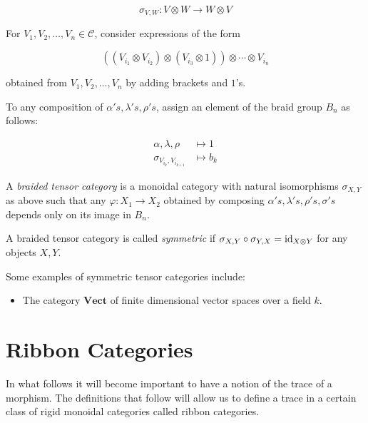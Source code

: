 \begin{equation}
    \sigma_{V,W} : V \otimes W \to W \otimes V
\end{equation}

For $V_1, V_2, \dots, V_n \in \mathcal{C}$, consider expressions of the form 

\begin{equation}
    ((V_{i_1}\otimes V_{i_2}) \otimes (V_{i_3} \otimes 1)) \otimes \cdots \otimes V_{i_n}
\end{equation}

obtained from $V_1,V_2,\ldots,V_n$ by adding brackets and $1$'s.

To any composition of $\alpha's, \lambda's, \rho's$, assign an element of the
braid group $B_n$ as follows:

\begin{align}
    \alpha, \lambda, \rho &\mapsto 1 \\
    \sigma_{V_{i_k}, V_{i_{k+1}}} &\mapsto b_k
\end{align}

\begin{defn}
    A \emph{braided tensor category} is a monoidal category with natural
    isomorphisms $\sigma_{X,Y}$ as above such that any $\varphi: X_1 \to X_2$
    obtained by composing $\alpha's, \lambda's, \rho's, \sigma's$ depends only
    on its image in $B_n$.
\end{defn}

\begin{defn}
    A braided tensor category is called \emph{symmetric} if $\sigma_{X,Y} \circ
    \sigma_{Y,X} = \operatorname{id}_{X \otimes Y}$ for any objects $X,Y$.
\end{defn}

Some examples of symmetric tensor categories include:

\begin{itemize}
    \item The category $\mathbf{Vect}$ of finite dimensional vector spaces over a field $k$.
\end{itemize}

\section{Ribbon Categories}
\label{section:RibbonCategories}

In what follows it will become important to have a notion of the trace of a
morphism. The definitions that follow will allow us to define a trace in a
certain class of rigid monoidal categories called ribbon categories.


